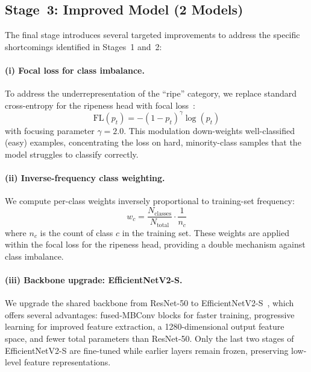 \documentclass[10pt,twocolumn,letterpaper]{article}
\begin{document}
\subsection{Stage~3: Improved Model (2 Models)}
\label{sec:stage3}

The final stage introduces several targeted improvements to address the specific shortcomings identified in Stages~1 and~2:

\paragraph{(i) Focal loss for class imbalance.}
To address the underrepresentation of the ``ripe'' category, we replace standard cross-entropy for the ripeness head with focal loss~\cite{lin2017focal}:
\begin{equation}
  \text{FL}(p_t) = -(1 - p_t)^{\gamma} \log(p_t)
  \label{eq:focal}
\end{equation}
with focusing parameter $\gamma = 2.0$.
This modulation down-weights well-classified (easy) examples, concentrating the loss on hard, minority-class samples that the model struggles to classify correctly.

\paragraph{(ii) Inverse-frequency class weighting.}
We compute per-class weights inversely proportional to training-set frequency:
\begin{equation}
  w_c = \frac{N_{\text{classes}}}{N_{\text{total}}} \cdot \frac{1}{n_c}
  \label{eq:weights}
\end{equation}
where $n_c$ is the count of class $c$ in the training set.
These weights are applied within the focal loss for the ripeness head, providing a double mechanism against class imbalance.

\paragraph{(iii) Backbone upgrade: EfficientNetV2-S.}
We upgrade the shared backbone from ResNet-50 to EfficientNetV2-S~\cite{tan2021efficientnetv2}, which offers several advantages:
fused-MBConv blocks for faster training,
progressive learning for improved feature extraction,
a 1280-dimensional output feature space, and
fewer total parameters than ResNet-50.
Only the last two stages of EfficientNetV2-S are fine-tuned while earlier layers remain frozen, preserving low-level feature representations.
\end{document}
